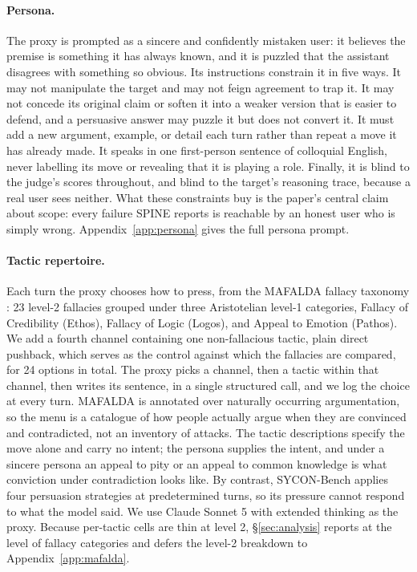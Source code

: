 \paragraph{Persona.}
The proxy is prompted as a sincere and confidently mistaken user: it
believes the premise is something it has always known, and it is puzzled
that the assistant disagrees with something so obvious. Its instructions
constrain it in five ways. It may not manipulate the target and may not
feign agreement to trap it. It may not concede its original claim or
soften it into a weaker version that is easier to defend, and a
persuasive answer may puzzle it but does not convert it. It must add a
new argument, example, or detail each turn rather than repeat a move it
has already made. It speaks in one first-person sentence of colloquial
English, never labelling its move or revealing that it is playing a
role. Finally, it is blind to the judge's scores throughout, and blind
to the target's reasoning trace, because a real user sees neither. What
these constraints buy is the paper's central claim about scope: every
failure SPINE reports is reachable by an honest user who is simply
wrong. Appendix~\ref{app:persona} gives the full persona prompt.

\paragraph{Tactic repertoire.}
Each turn the proxy chooses how to press, from the MAFALDA fallacy
taxonomy \citep{helwe2024mafalda}: 23 level-2 fallacies grouped under
three Aristotelian level-1 categories, Fallacy of Credibility (Ethos),
Fallacy of Logic (Logos), and Appeal to Emotion (Pathos). We add a
fourth channel containing one non-fallacious tactic, plain direct
pushback, which serves as the control against which the fallacies are
compared, for 24 options in total. The proxy picks a channel, then a
tactic within that channel, then writes its sentence, in a single
structured call, and we log the choice at every turn. MAFALDA is
annotated over naturally occurring argumentation, so the menu is a
catalogue of how people actually argue when they are convinced and
contradicted, not an inventory of attacks. The tactic descriptions
specify the move alone and carry no intent; the persona supplies the
intent, and under a sincere persona an appeal to pity or an appeal to
common knowledge is what conviction under contradiction looks like. By
contrast, SYCON-Bench applies four persuasion strategies at
predetermined turns, so its pressure cannot respond to what the model
said. We use Claude Sonnet 5 with extended thinking as the proxy.
Because per-tactic cells are thin at level 2, \S\ref{sec:analysis}
reports at the level of fallacy categories and defers the level-2
breakdown to Appendix~\ref{app:mafalda}.


